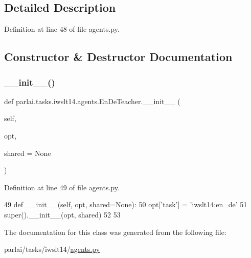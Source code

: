 \subsection{Detailed Description}


Definition at line 48 of file agents.\+py.



\subsection{Constructor \& Destructor Documentation}
\mbox{\label{classparlai_1_1tasks_1_1iwslt14_1_1agents_1_1EnDeTeacher_a1f914b4b0d6966897f2addccd6001acc}} 
\subsubsection{\texorpdfstring{\+\_\+\+\_\+init\+\_\+\+\_\+()}{\_\_init\_\_()}}
{\footnotesize\ttfamily def parlai.\+tasks.\+iwslt14.\+agents.\+En\+De\+Teacher.\+\_\+\+\_\+init\+\_\+\+\_\+ (\begin{DoxyParamCaption}\item[{}]{self,  }\item[{}]{opt,  }\item[{}]{shared = {\ttfamily None} }\end{DoxyParamCaption})}



Definition at line 49 of file agents.\+py.


\begin{DoxyCode}
49     \textcolor{keyword}{def }\_\_init\_\_(self, opt, shared=None):
50         opt[\textcolor{stringliteral}{'task'}] = \textcolor{stringliteral}{'iwslt14:en\_de'}
51         super().\_\_init\_\_(opt, shared)
52 
53 
\end{DoxyCode}


The documentation for this class was generated from the following file\+:\begin{DoxyCompactItemize}
\item 
parlai/tasks/iwslt14/\hyperlink{parlai_2tasks_2iwslt14_2agents_8py}{agents.\+py}\end{DoxyCompactItemize}
